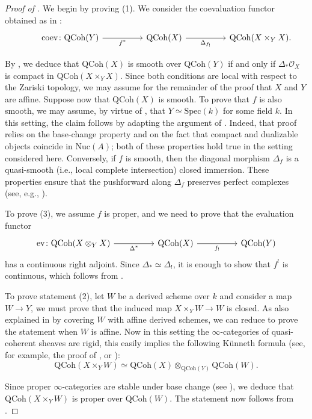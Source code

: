 \documentclass[oneside, hidelinks, 12pt, a4paper,reqno]{amsart}
\theoremstyle{plain}
\theoremstyle{definition}
\theoremstyle{plain}
\newcommand{\cO}{\mathscr O}
\newcommand{\Spec}{\mathrm{Spec}}
\newcommand{\cates}{$\infty$-categories }
\newcommand{\Nuc}{\mathrm{Nuc}}
\newcommand{\Qcoh}{\mathrm{QCoh}}
\newcommand{\ev}{\mathrm{ev}}
\begin{document}
\begin{proof}[Proof of ]
We begin by proving (1). We consider the coevaluation functor obtained as in :
\[
\begin{tikzcd}
	& {\mathrm{coev}\colon\Qcoh(Y)} && {\Qcoh(X)} && {\Qcoh(X\times_{Y} X).}
	\arrow["{f^{\ast}}"', from=1-2, to=1-4]
	\arrow["{\Delta_{f_!}}"', from=1-4, to=1-6]
\end{tikzcd}
\]

By , we deduce that $\Qcoh(X)$ is smooth over $\Qcoh(Y)$ if and only if $\Delta_\ast \cO_X$ is compact in $\Qcoh(X \times_Y X)$. Since both conditions are local with respect to the Zariski topology, we may assume for the remainder of the proof that $X$ and $Y$ are affine. Suppose now that $\Qcoh(X)$ is smooth. To prove that $f$ is also smooth, we may assume, by virtue of \cite[Proposition 11.2.3.6]{SAG}, that $Y \simeq \Spec(k)$ for some field $k$. In this setting, the claim follows by adapting the argument of . Indeed, that proof relies on the base-change property and on the fact that compact and dualizable objects coincide in $\Nuc(A)$; both of these properties hold true in the setting considered here. Conversely, if $f$ is smooth, then the diagonal morphism $\Delta_f$ is a quasi-smooth (i.e., local complete intersection) closed immersion. These properties ensure that the pushforward along $\Delta_f$ preserves perfect complexes (see, e.g., \cite{toen2012properlocalcompleteintersection}).

To prove (3), we assume $f$ is proper, and we need to prove that the evaluation functor
\[
\begin{tikzcd}
	{\ev\colon\Qcoh(X\otimes_{Y} X)} && {\Qcoh(X)} && {\Qcoh(Y)}
	\arrow["{\Delta^*}"', from=1-1, to=1-3]
	\arrow["{f_!}"', from=1-3, to=1-5]
\end{tikzcd}
\]
has a continuous right adjoint. Since $\Delta_\ast \simeq \Delta_!$, it is enough to show that $f^{!}$ is continuous, which follows from \cite[Theorem 8.13]{scholze2025sixfunctorformalisms}. 

To prove statement (2), let $W$ be a derived scheme over $k$ and consider a map $W \to Y$, we must prove that the induced map $X\times_Y W \to W$ is closed. As also explained in \cite[\href{https://stacks.math.columbia.edu/tag/0CL3}{Tag 0CL3}]{stacks-project} by covering $W$ with affine derived schemes, we can reduce to prove the statement when $W$ is affine. Now in this setting the \cates of quasi-coherent sheaves are rigid, this easily implies the following K\"unneth formula (see, for example, the proof of , or \cite{benzvi2010integraltransformsdrinfeldcenters}):
\[
\Qcoh(X\times_Y W) \simeq \Qcoh(X)\otimes_{\Qcoh(Y)} \Qcoh(W).
\]

Since proper \cates are stable under base change (see \cite[Proposition 11.1.1.5]{SAG}), we deduce that $\Qcoh(X\times_Y W)$ is proper over $\Qcoh(W)$. The statement now follows from \cite[Lemma 11.1.4.6]{SAG}.
\end{proof}
\end{document}
